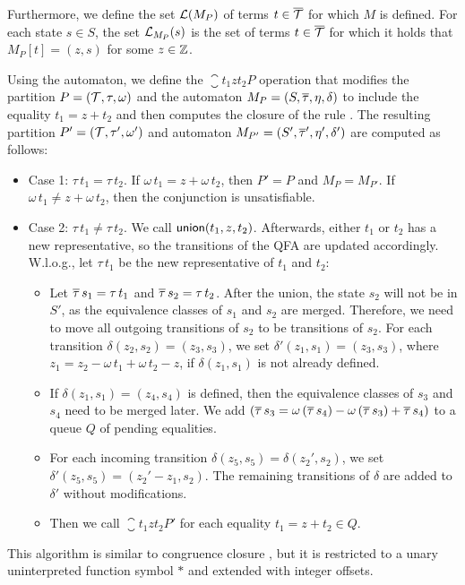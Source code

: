 Furthermore, we define the set $\mathcal{L}(M_P)$ of terms $t \in {\overline{\mathcal{T}}}$ for which $M$ is defined.
For each state $s \in S$, the set $\mathcal{L}_{M_P}(s)$ is the set of terms $t \in {\overline{\mathcal{T}}}$ for which it holds that $M_P[t] = (z, s)$ for some $z \in \mathbb{Z}$.

Using the automaton, we define the $\closure{t_1}{z}{t_2}{P}$ operation that modifies the partition $P = (\mathcal{T}, \tau, \omega)$ and the automaton $M_P = (S, \overline{\tau}, \eta, \delta)$ to include the equality $t_1 = z + t_2$ and then computes the closure of the rule .
The resulting partition $P' = (\mathcal{T}, \tau', \omega')$ and automaton $M_{P'} = (S', \overline{\tau}', \eta', \delta')$  are computed as follows:
\begin{itemize}
  \item Case 1: $\tau\,t_1 = \tau\,t_2$. If $\omega\,t_1 = z + \omega\,t_2$, then $P' = P$ and $M_P = M_{P'}$.
        If $\omega\,t_1 \neq z + \omega\,t_2$, then the conjunction is unsatisfiable.
  \item Case 2: $\tau\,t_1 \neq \tau\,t_2$. We call $\textsf{union}(t_1, z, t_2)$.
        Afterwards, either $t_1$ or $t_2$ has a new representative, so the transitions of the QFA are updated accordingly.
        W.l.o.g., let $\tau\,t_1$ be the new representative of $t_1$ and $t_2$:
        \begin{itemize}
          \item Let $\overline{\tau}\,s_1 = \tau\,t_1$ and $\overline{\tau}\,s_2 = \tau\,t_2$.
                After the union, the state $s_2$ will not be in $S'$, as the equivalence classes of $s_1$ and $s_2$ are merged.
                Therefore, we need to move all outgoing transitions of $s_2$ to be transitions of $s_2$.
                For each transition $\delta(z_2, s_2) = (z_3, s_3)$, we set $\delta'(z_1, s_1) = (z_3, s_3)$, where $z_1 = z_2 - \omega\,t_1 + \omega\,t_2 - z$, if $\delta(z_1,s_1)$ is not already defined.
          \item If $\delta(z_1,s_1) = (z_4, s_4)$ is defined, then the equivalence classes of $s_3$ and $s_4$ need to be merged later.
                We add $(\overline{\tau}\,s_3 = \omega\,(\overline{\tau}\,s_4) - \omega\,(\overline{\tau}\,s_3) + \overline{\tau}\,s_4)$ to a queue $Q$ of pending equalities.
          \item For each incoming transition $\delta(z_5, s_5) = \delta(z_2', s_2)$, we set $\delta'(z_5, s_5) = (z_2' - z_1, s_2)$.
                The remaining transitions of $\delta$ are added to $\delta'$ without modifications.
          \item Then we call $\closure{t_1}{z}{t_2}{P'}$ for each equality $t_1 = z + t_2 \in Q$.
        \end{itemize}
\end{itemize}
This algorithm is similar to congruence closure \cite{cc-tarjan,cc-shostak}, but it is restricted to a unary uninterpreted function symbol $*$ and extended with integer offsets.

